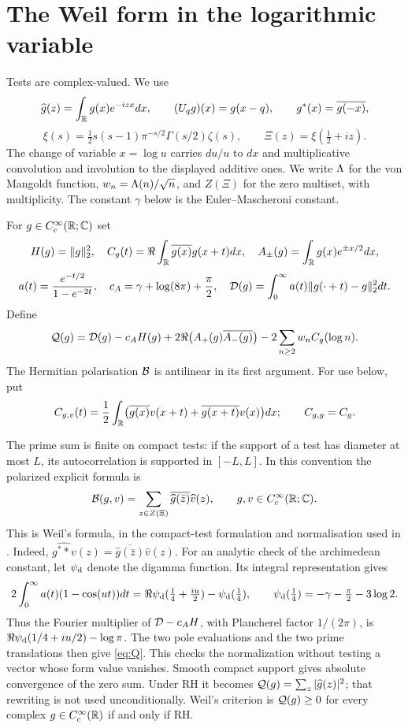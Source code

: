 \section{The Weil form in the logarithmic variable}\label{sec:setup}

Tests are complex-valued. We use
\[
 \widehat g(z)=\int_{\mathbb R}g(x)e^{-izx}dx,\qquad
 (U_qg)(x)=g(x-q),\qquad g^*(x)=\overline{g(-x)},
\]
\[
 \xi(s)=\tfrac12s(s-1)\pi^{-s/2}\Gamma(s/2)\zeta(s),\qquad
 \Xi(z)=\xi(\tfrac12+iz).
\]
The change of variable $x=\log u$ carries $du/u$ to $dx$ and
multiplicative convolution and involution to the displayed additive
ones. We write $\Lambda$ for the von Mangoldt function,
$w_n=\Lambda(n)/\sqrt n$, and $Z(\Xi)$ for the zero multiset, with
multiplicity. The constant $\gamma$ below is the Euler--Mascheroni
constant.

\begin{definition}\label{def:Q}
For $g\in C_c^\infty(\mathbb R;\mathbb C)$ set
\[
 H(g)=\|g\|_2^2,\quad
 C_g(t)=\Re\int_{\mathbb R}\overline{g(x)}g(x+t)dx,\quad
 A_\pm(g)=\int_{\mathbb R}g(x)e^{\pm x/2}dx,
\]
\[
 a(t)=\frac{e^{-t/2}}{1-e^{-2t}},\quad
 c_A=\gamma+\log(8\pi)+\frac\pi2,\quad
 \mathcal D(g)=\int_0^\infty a(t)\|g(\cdot+t)-g\|_2^2dt.
\]
Define
\begin{equation}\label{eq:Q}
 \mathcal Q(g)=\mathcal D(g)-c_AH(g)
 +2\Re\bigl(A_+(g)\overline{A_-(g)}\bigr)
 -2\sum_{n\ge2}w_nC_g(\log n).
\end{equation}
The Hermitian polarisation $\mathcal B$ is antilinear in its first argument.
For use below, put
\[
 C_{g,v}(t)=\frac12\int_{\mathbb R}
  \bigl(\overline{g(x)}v(x+t)+\overline{g(x+t)}v(x)\bigr)dx;
 \qquad C_{g,g}=C_g.
\]
\end{definition}

The prime sum is finite on compact tests: if the support of a test has
diameter at most $L$, its autocorrelation is supported in $[-L,L]$.
In this convention the polarized explicit formula is
\begin{equation}\label{eq:EF}
 \mathcal B(g,v)=\sum_{z\in Z(\Xi)}
          \overline{\widehat g(\bar z)}\widehat v(z),
 \qquad g,v\in C_c^\infty(\mathbb R;\mathbb C).
\end{equation}
This is Weil's formula, in the compact-test formulation and
normalisation used in
\cite{BOMBIERI-WEILQF-2000,CCM-ZST-2025,Suzuki2023Screw}.
Indeed, $\widehat{g^**v}(z)=
\overline{\widehat g(\bar z)}\widehat v(z)$.
For an analytic check of the archimedean constant, let $\psi_{\rm d}$
denote the digamma function. Its integral representation gives
\[
 2\int_0^\infty a(t)(1-\cos(ut))dt
   =\Re\psi_{\rm d}(\tfrac14+\tfrac{iu}2)-\psi_{\rm d}(\tfrac14),
 \qquad
 \psi_{\rm d}(\tfrac14)=-\gamma-\tfrac\pi2-3\log2.
\]
Thus the Fourier multiplier of $\mathcal D-c_AH$, with Plancherel factor
$1/(2\pi)$, is
$\Re\psi_{\rm d}(1/4+iu/2)-\log\pi$.
The two pole evaluations and the two prime translations then give
\eqref{eq:Q}. This checks the normalization without testing a vector
whose form value vanishes. Smooth compact support gives absolute
convergence of the zero sum. Under RH it becomes
$\mathcal Q(g)=\sum_z|\widehat g(z)|^2$; that rewriting is not used
unconditionally. Weil's criterion is
$\mathcal Q(g)\ge0$ for every complex $g\in C_c^\infty(\mathbb R)$ if and only if RH.

